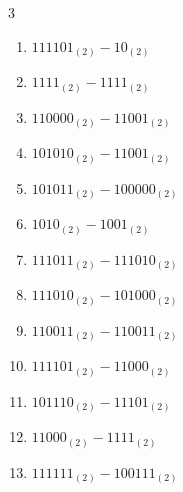 \begin{multicols}{3}
\begin{enumerate}

  \item $111101_{(2)} - 10_{(2)}$


  \item $1111_{(2)} - 1111_{(2)}$


  \item $110000_{(2)} - 11001_{(2)}$


  \item $101010_{(2)} - 11001_{(2)}$


  \item $101011_{(2)} - 100000_{(2)}$


  \item $1010_{(2)} - 1001_{(2)}$


  \item $111011_{(2)} - 111010_{(2)}$


\columnbreak %

  \item $111010_{(2)} - 101000_{(2)}$


  \item $110011_{(2)} - 110011_{(2)}$


  \item $111101_{(2)} - 11000_{(2)}$


  \item $101110_{(2)} - 11101_{(2)}$


  \item $11000_{(2)} - 1111_{(2)}$


  \item $111111_{(2)} - 100111_{(2)}$



\end{enumerate}
\end{multicols}
